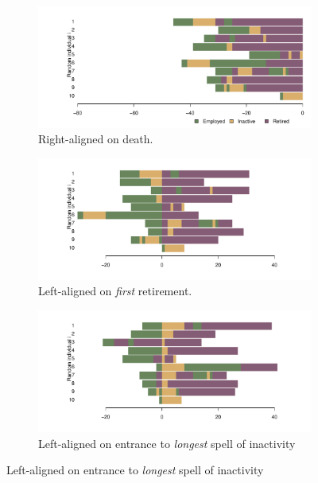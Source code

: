 \documentclass{article}
\begin{document}
 \begin{figure}[ht!]
\centering
\caption{The sequences from Figure~\ref{fig:seq10} under a variety of alignment
types.}
\label{fig:alignment}

\begin{subfigure}{\textwidth}
\centering
\caption{Right-aligned on death.}
\label{fig:seq10death}
\includegraphics[scale=.5]{Figures/Seq10deathalign.pdf}
\end{subfigure}

\begin{subfigure}{\textwidth}
\centering
\caption{Left-aligned on \emph{first} retirement.}
\label{fig:firstretire}
\includegraphics[scale=.5]{Figures/Seq10firstretirealign.pdf}
\end{subfigure}

\begin{subfigure}{\textwidth}
\centering
\caption{Left-aligned on entrance to \emph{longest} spell of inactivity}
\label{fig:longinactleft}
\includegraphics[scale=.5]{Figures/Seq10inactlongleft.pdf}
\end{subfigure}


\end{figure}
\end{document}
